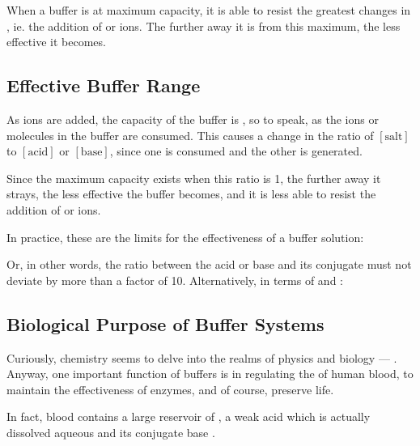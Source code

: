 			When a buffer is at maximum capacity, it is able to resist the greatest changes in \pH{}, ie. the addition of  or 
			ions. The further away it is from this maximum, the less effective it becomes.



		\subsection{Effective Buffer Range}

			As  ions are added, the capacity of the buffer is , so to speak, as the ions or molecules in the buffer are
			consumed. This causes a change in the ratio of $[\mathrm{salt}]$ to $[\mathrm{acid}]$ or $[\mathrm{base}]$, since one is consumed
			and the other is generated.

			Since the maximum capacity exists when this ratio is 1, the further away it strays, the less effective the buffer becomes,
			and it is less able to resist the addition of  or  ions.

			In practice, these are the limits for the effectiveness of a buffer solution:


			\pagebreak
			Or, in other words, the ratio between the acid or base and its conjugate must not deviate by more than a factor of \num{10}. Alternatively,
			in terms of \pH{} and \pOH{}:

			\mathdiagram{
				\[ \MpH\; range = \MpKa \pm 1 \hspace{12mm} \MpOH\; range = \MpKb \pm 1 \]
			}



		\subsection{Biological Purpose of Buffer Systems}

			Curiously, chemistry seems to delve into the realms of physics and biology --- . Anyway,
			one important function of buffers is in regulating the \pH{} of human blood, to maintain the effectiveness of enzymes, and of course,
			preserve life.

			In fact, blood contains a large reservoir of , a weak acid which is actually dissolved aqueous  and its
			conjugate base .

